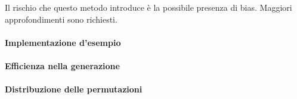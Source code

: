 \documentclass[../../../main.tex]{subfiles}
\begin{document}
Il rischio che questo metodo introduce è la possibile presenza di bias.
Maggiori approfondimenti sono richiesti.

\paragraph{Implementazione d'esempio}


\paragraph{Efficienza nella generazione}

\paragraph{Distribuzione delle permutazioni}
\end{document}
